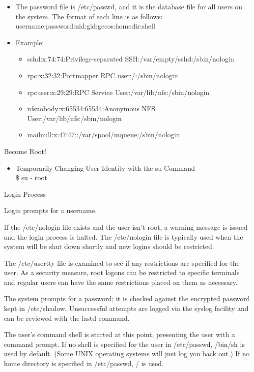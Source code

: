 \documentclass{beamer}
\begin{document}
\begin{frame}{}
\begin{itemize}
\item The password file is /etc/passwd, and it is the database file for all users on the system. The format of each line is as follows:\\
username:password:uid:gid:gecos:homedir:shell\\
\item Example:
\begin{itemize}
\item sshd:x:74:74:Privilege-separated SSH:/var/empty/sshd:/sbin/nologin
\item rpc:x:32:32:Portmapper RPC user:/:/sbin/nologin
\item rpcuser:x:29:29:RPC Service User:/var/lib/nfs:/sbin/nologin
\item nfsnobody:x:65534:65534:Anonymous NFS User:/var/lib/nfs:/sbin/nologin
\item mailnull:x:47:47::/var/spool/mqueue:/sbin/nologin
\end{itemize}
\end{itemize}
\end{frame}

\begin{frame}{Become Root!}
\begin{itemize}
\item Temporarily Changing User Identity with the su Command\\
\$ su - root
\end{itemize}
\end{frame}

\begin{frame}{Login Process}
\begin{itemize}
{\footnotesize
\item Login prompts for a username.
\item If the /etc/nologin file exists and the user isn't root, a warning message is issued and the login process is halted. The /etc/nologin file is typically used when the system will be shut down shortly and new logins should be restricted.
\item The /etc/usertty file is examined to see if any restrictions are specified for the user. As a security measure, root logons can be restricted to specific terminals and regular users can have the same restrictions placed on them as necessary.
\item The system prompts for a password; it is checked against the encrypted password kept in /etc/shadow. Unsuccessful attempts are logged via the syslog facility and can be reviewed with the lastd command.
\item The user's command shell is started at this point, presenting the user with a command prompt. If no shell is specified for the user in /etc/passwd, /bin/sh is used by default. (Some UNIX operating systems will just log you back out.) If no home directory is specified in /etc/passwd, / is used.
}
\end{itemize}
\end{frame}
\end{document}
